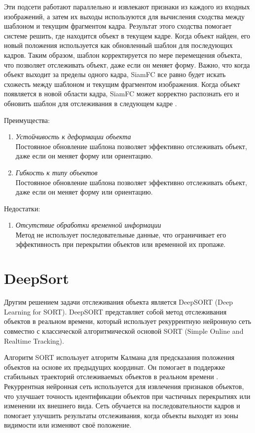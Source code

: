 Эти подсети работают параллельно и извлекают признаки из каждого из входных изображений, а затем их выходы используются для вычисления сходства между шаблоном и текущим фрагментом кадра. Результат этого сходства помогает системе решить, где находится объект в текущем кадре. Когда объект найден, его новый положения используется как обновленный шаблон для последующих кадров. Таким образом, шаблон корректируется по мере перемещения объекта, что позволяет отслеживать объект, даже если он меняет форму. Важно, что когда объект выходит за пределы одного кадра, SiamFC все равно будет искать схожесть между шаблоном и текущим фрагментом изображения. Когда объект появляется в новой области кадра, SiamFC может корректно распознать его и обновить шаблон для отслеживания в следующем кадре \cite{Bertinetto2016}.

Преимущества:
\begin{enumerate}
\item \textit{Устойчивость к деформации объекта} \\
Постоянное обновление шаблона позволяет эффективно отслеживать объект, даже если он меняет форму или ориентацию.

\item \textit{Гибкость к типу объектов} \\
Постоянное обновление шаблона позволяет эффективно отслеживать объект, даже если он меняет форму или ориентацию. 
\end{enumerate}

Недостатки:
\begin{enumerate}
\item \textit{Отсутствие обработки временной информации} \\  Метод не использует последовательные данные, что ограничивает его эффективность при перекрытии объектов или временной их пропаже. 
\end{enumerate}

\section{DeepSort}
Другим решением задачи отслеживания объекта является DeepSORT (Deep Learning for SORT). DeepSORT представляет собой метод отслеживания объектов в реальном времени, который использует рекуррентную нейронную сеть совместно с классической алгоритмической основой SORT (Simple Online and Realtime Tracking).

Алгоритм SORT использует алгоритм Калмана для предсказания положения объектов на основе их предыдущих координат. Он помогает в поддержке стабильных траекторий отслеживаемых объектов в реальном времени \cite{ImprovedDeepSORT2023}.
Рекуррентная нейронная сеть используется для извлечения признаков объектов, что улучшает точность идентификации объектов при частичных перекрытиях или изменении их внешнего вида. Сеть обучается на последовательности кадров и помогает улучшить результаты отслеживания, когда объекты выходят из зоны видимости или изменяют своё положение.


